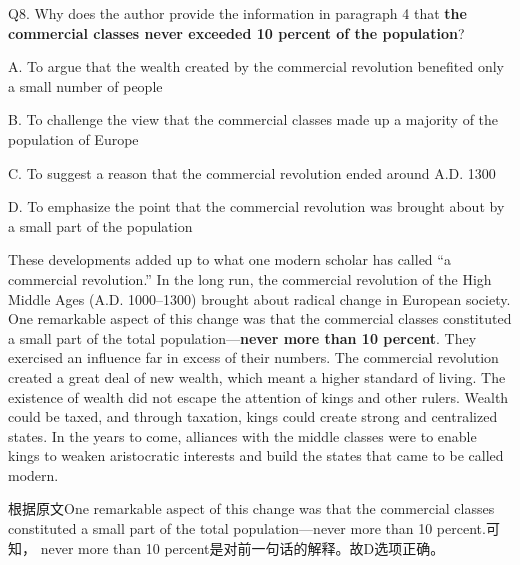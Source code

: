 \begin{blk}
    \begin{qst}
        Q8. Why does the author provide the information in paragraph 4 that \textbf{the commercial classes never exceeded 10 percent of the population}?
    \end{qst}

    \begin{chc}
        A. To argue that the wealth created by the commercial revolution benefited only a small number of people

        B. To challenge the view that the commercial classes made up a majority of the population of Europe

        C. To suggest a reason that the commercial revolution ended around A.D. 1300

        D. To emphasize the point that the commercial revolution was brought about by a small part of the population
    \end{chc}

    \begin{psgq}
        These developments added up to what one modern scholar has called “a commercial revolution.” In the long run, the commercial revolution of the High Middle Ages (A.D. 1000–1300) brought about radical change in European society. One remarkable aspect of this change was that the commercial classes constituted a small part of the total population—\textbf{never more than 10 percent}. They exercised an influence far in excess of their numbers. The commercial revolution created a great deal of new wealth, which meant a higher standard of living. The existence of wealth did not escape the attention of kings and other rulers. Wealth could be taxed, and through taxation, kings could create strong and centralized states. In the years to come, alliances with the middle classes were to enable kings to weaken aristocratic interests and build the states that came to be called modern.
    \end{psgq}

    \begin{nlz}
        根据原文One remarkable aspect of this change was that the commercial classes constituted a small part of the total population—never more than 10 percent.可知， never more than 10 percent是对前一句话的解释。故D选项正确。
    \end{nlz}
\end{blk}

